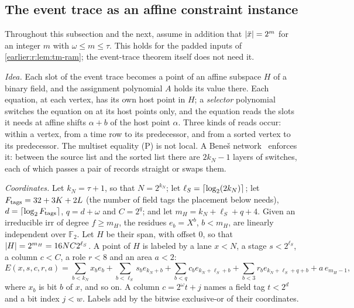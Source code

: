 \subsection{The event trace as an affine constraint instance}\label{earlier:r:app:affine-embedding}

Throughout this subsection and the next, assume in addition that
\(\left|\bar x\right|=2^m\) for an integer \(m\) with \(\omega\le m\le\tau\).
This holds for the padded inputs of \cref{earlier:r:lem:tm-ram}; the event-trace
theorem itself does not need it.

\emph{Idea.} Each slot of the event trace becomes a point of an affine
subspace \(H\) of a binary field, and the assignment polynomial \(A\)
holds its value there. Each equation, at each vertex, has its own host point in \(H\); a
\emph{selector} polynomial switches the equation on at its host points
only, and the equation reads the slots it needs at affine shifts
\(\alpha+b\) of the host point \(\alpha\). Three kinds of reads occur: within a
vertex, from a time row to its predecessor, and from a sorted vertex to
its predecessor. The multiset equality (P) is not local. A Beneš
network~\cite{Ben65} enforces it: between the source list and the sorted list there
are \(2k_N-1\) layers of switches, each of which passes a pair of
records straight or swaps them.

\emph{Coordinates.} Let \(k_N=\tau+1\), so that \(N=2^{k_N}\); let
\(\ell_S=\left\lceil\log_2(2k_N)\right\rceil\); let \(F_{\rm tags}=32+3K+2L\) (the number
of field tags the placement below needs),
\(d=\left\lceil\log_2 F_{\rm tags}\right\rceil\), \(q=d+\omega\) and \(C=2^q\); and let
\(m_H=k_N+\ell_S+q+4\). Given an irreducible \(\mathrm{irr}\) of degree
\(f\ge m_H\), the residues \(e_b=X^b\), \(b<m_H\), are linearly
independent over \(\mathbb F_2\). Let \(H\) be their span, with offset
\(0\), so that \(\left|H\right|=2^{m_H}=16NC2^{\ell_S}\). A point of \(H\) is
labeled by a lane \(x<N\), a stage \(s<2^{\ell_S}\), a column \(c<C\), a
role \(r<8\) and an area \(a<2\):
\[
 E(x,s,c,r,a)=\sum_{b<k_N}x_be_b+\sum_{b<\ell_S}s_be_{k_N+b}
 +\sum_{b<q}c_be_{k_N+\ell_S+b}+\sum_{b<3}r_be_{k_N+\ell_S+q+b}
 +a\,e_{m_H-1},
\]
where \(x_b\) is bit \(b\) of \(x\), and so on. A column \(c=2^\omega
t+j\) names a field tag \(t<2^d\) and a bit index \(j<w\). Labels add by
the bitwise exclusive-or of their coordinates.

